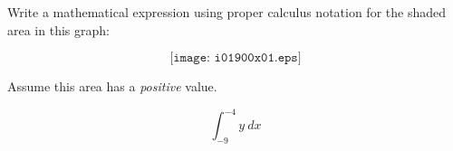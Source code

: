 

Write a mathematical expression using proper calculus notation for the shaded area in this graph:

$$\texttt{[image: i01900x01.eps]}$$

Assume this area has a {\it positive} value.







$$\int_{-9}^{-4} y \> dx$$











